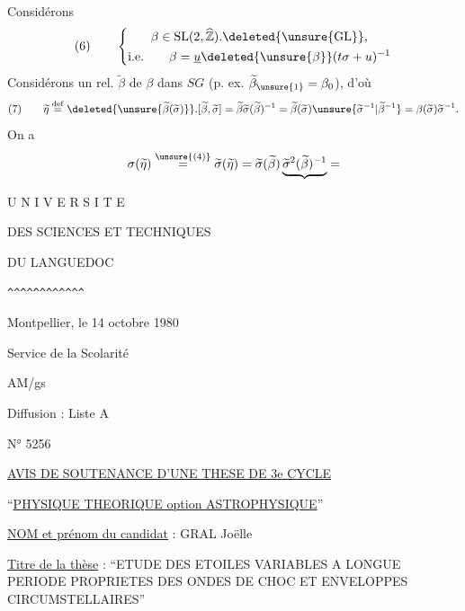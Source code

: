 Considérons
\[
(6)\qquad
\left\{\begin{gathered}
\beta\in\mathrm{SL}(2,\widehat{\mathbb Z}).\deleted{\unsure{\mathrm{GL}}},
\\
\text{i.e.}\qquad
\beta=\underline u\deleted{\unsure{\beta}}(t\sigma+u)^{-1}
\end{gathered}\right.
\]
Considérons un rel. $\widetilde\beta$ de $\beta$ dans $SG$
(p. ex. $\widetilde\beta_{\unsure{1}}=\beta_0$), d'où
\[
(7)\qquad
\widetilde\eta\overset{\mathrm{def}}=
\deleted{\unsure{\widetilde\beta(\widetilde\sigma)}}.
[\widetilde\beta,\widetilde\sigma]
=\widetilde\beta\widetilde\sigma(\widetilde\beta)^{-1}
=\widetilde\beta(\widetilde\sigma)
 \unsure{\widetilde\sigma^{-1}|\widetilde\beta^{-1}}
=\beta(\widetilde\sigma)\widetilde\sigma^{-1}.
\]
On a
\[
\sigma(\widetilde\eta)\overset{\unsure{(4)}}=
\widetilde\sigma(\widetilde\eta)
=\widetilde\sigma(\widetilde\beta)
 \underbrace{\widetilde\sigma^2(\widetilde\beta)^{-1}}=
\]

U N I V E R S I T E

DES SCIENCES ET TECHNIQUES

DU LANGUEDOC

\verb|^^^^^^^^^^^^|

\hfill Montpellier, le 14 octobre 1980

Service de la Scolarité

AM/gs

Diffusion : Liste A

N° 5256

\begin{center}
\uline{AVIS DE SOUTENANCE D'UNE THESE DE 3e CYCLE}

``\uline{PHYSIQUE THEORIQUE option ASTROPHYSIQUE}''
\end{center}

\uline{NOM et prénom du candidat} : GRAL Joëlle

\uline{Titre de la thèse} : ``ETUDE DES ETOILES VARIABLES A LONGUE PERIODE PROPRIETES DES ONDES DE CHOC ET ENVELOPPES CIRCUMSTELLAIRES''

